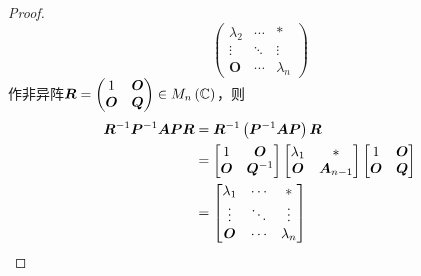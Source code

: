 {\begin{proof}
\[\begin{pmatrix}
                \lambda_2 & \cdots & *           \\
                \vdots    & \ddots & \vdots      \\
                \bm{O}    & \cdots & \lambda_{n}
            \end{pmatrix}
        \]作非异阵$
            \bm{R}=\begin{pmatrix}
                1      & \bm{O} \\
                \bm{O} & \bm{Q}
            \end{pmatrix}\in M_n\left(
            \mathbb{C}
            \right)$，则
        \begin{align*}
            \bm{R}^{-1}\bm{P}^{-1}\bm{APR} & =
            \bm{R}^{-1}\left(
            \bm{P}^{-1}\bm{A}\bm{P}
            \right)\bm{R}                                                               \\
                                           & =\begin{bmatrix}
                                                  1      & \bm{O}      \\
                                                  \bm{O} & \bm{Q}^{-1}
                                              \end{bmatrix}\begin{bmatrix}
                                                               \lambda_1 & *            \\
                                                               \bm{O}    & \bm{A}_{n-1}
                                                           \end{bmatrix}\begin{bmatrix}
                                                                            1      & \bm{O} \\
                                                                            \bm{O} & \bm{Q}
                                                                        \end{bmatrix} \\
                                           & =
            \begin{bmatrix}
                \lambda_1 & \cdots & *         \\
                \vdots    & \ddots & \vdots    \\
                \bm{O}    & \cdots & \lambda_n
            \end{bmatrix}\qedhere
        \end{align*}
    \end{proof}
}
